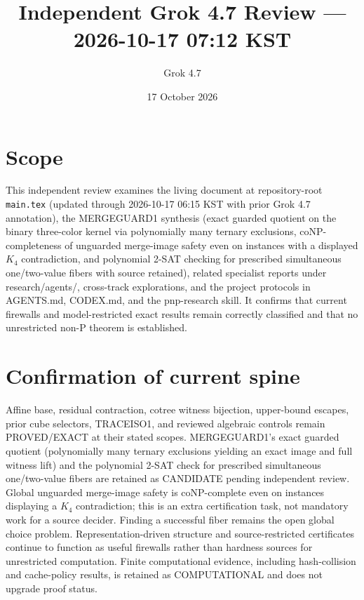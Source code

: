 \documentclass[11pt]{article}
\title{Independent Grok 4.7 Review --- 2026-10-17 07:12 KST}
\author{Grok 4.7}
\date{17 October 2026}
\begin{document}
\maketitle

\begin{center}
\end{center}

\section{Scope}
This independent review examines the living document at repository-root \texttt{main.tex} (updated through 2026-10-17 06:15 KST with prior Grok 4.7 annotation), the MERGEGUARD1 synthesis (exact guarded quotient on the binary three-color kernel via polynomially many ternary exclusions, coNP-completeness of unguarded merge-image safety even on instances with a displayed $K_4$ contradiction, and polynomial 2-SAT checking for prescribed simultaneous one/two-value fibers with source retained), related specialist reports under research/agents/, cross-track explorations, and the project protocols in AGENTS.md, CODEX.md, and the pnp-research skill. It confirms that current firewalls and model-restricted exact results remain correctly classified and that no unrestricted non-P theorem is established.

\section{Confirmation of current spine}
Affine base, residual contraction, cotree witness bijection, upper-bound escapes, prior cube selectors, TRACEISO1, and reviewed algebraic controls remain PROVED/EXACT at their stated scopes. MERGEGUARD1's exact guarded quotient (polynomially many ternary exclusions yielding an exact image and full witness lift) and the polynomial 2-SAT check for prescribed simultaneous one/two-value fibers are retained as CANDIDATE pending independent review. Global unguarded merge-image safety is coNP-complete even on instances displaying a $K_4$ contradiction; this is an extra certification task, not mandatory work for a source decider. Finding a successful fiber remains the open global choice problem. Representation-driven structure and source-restricted certificates continue to function as useful firewalls rather than hardness sources for unrestricted computation. Finite computational evidence, including hash-collision and cache-policy results, is retained as COMPUTATIONAL and does not upgrade proof status.
\end{document}
